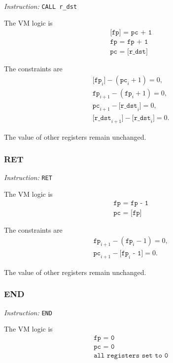 \emph{Instruction:} \verb|CALL r_dst|

The VM logic is
\begin{align*}
    & \texttt{[fp] = pc + 1} \\
    & \texttt{fp = fp + 1} \\
    & \texttt{pc = [r\_dst]}
\end{align*}

The constraints are
\begin{align*}
    & \texttt{[fp}_i\texttt{]} - (\texttt{pc}_i + 1) = 0, \\
    & \texttt{fp}_{i+1} - (\texttt{fp}_i + 1) = 0, \\
    & \texttt{pc}_{i+1} - \texttt{[r\_dst}_i\texttt{]} = 0, \\
    & \texttt{[r\_dst}_{i+1}\texttt{]} - \texttt{[r\_dst}_i\texttt{]} = 0.
\end{align*}

The value of other registers remain unchanged.

\subsubsection{RET}

\emph{Instruction:} \verb|RET|

The VM logic is
\begin{align*}
    & \texttt{fp = fp - 1} \\
    & \texttt{pc = [fp]}
\end{align*}

The constraints are
\begin{align*}
    & \texttt{fp}_{i+1} - (\texttt{fp}_i - 1) = 0, \\
    & \texttt{pc}_{i+1} - \texttt{[fp}_i\texttt{ - 1]} = 0.
\end{align*}

The value of other registers remain unchanged.

\subsubsection{END}

\emph{Instruction:} \verb|END|

The VM logic is
\begin{align*}
    & \texttt{fp = 0} \\
    & \texttt{pc = 0} \\
    & \texttt{all registers set to 0}
\end{align*}

